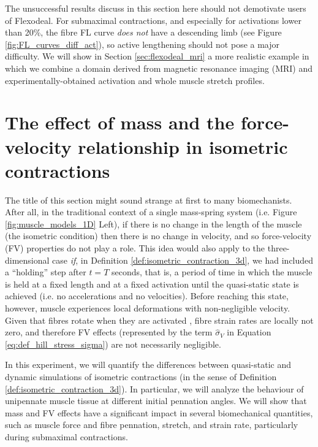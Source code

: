 \documentclass{sfuthesis}
\numberwithin{equation}{section}
\numberwithin{figure}{chapter}
\numberwithin{table}{chapter}
\theoremstyle{definition}
\begin{document}
The unsuccessful results discuss in this section here should not demotivate users of Flexodeal. For submaximal contractions, and especially for activations lower than 20\%, the fibre FL curve \textit{does not} have a descending limb (see Figure \ref{fig:FL_curves_diff_act}), so active lengthening should not pose a major difficulty. We will show in Section \ref{sec:flexodeal_mri} a more realistic example in which we combine a domain derived from magnetic resonance imaging (MRI) and experimentally-obtained activation and whole muscle stretch profiles.

\section{The effect of mass and the force-velocity relationship in isometric contractions} \label{sec:flexodeal_dynamic_effects}

The title of this section might sound strange at first to many biomechanists. After all, in the traditional context of a single mass-spring system (i.e. Figure \ref{fig:muscle_models_1D} Left), if there is no change in the length of the muscle (the isometric condition) then there is no change in velocity, and so force-velocity (FV) properties do not play a role. This idea would also apply to the three-dimensional case \textit{if}, in Definition \ref{def:isometric_contraction_3d}, we had included a ``holding'' step after $t = T$ seconds, that is, a period of time in which the muscle is held at a fixed length and at a fixed activation until the quasi-static state is achieved (i.e. no accelerations and no velocities). Before reaching this state, however, muscle experiences local deformations with non-negligible velocity. Given that fibres rotate when they are activated \cite{LieberFriden2000}, fibre strain rates are locally not zero, and therefore FV effects (represented by the term $\widehat{\sigma}_V$ in Equation \eqref{eq:def_hill_stress_sigma}) are not necessarily negligible.

In this experiment, we will quantify the differences between quasi-static and dynamic simulations of isometric contractions (in the sense of Definition \ref{def:isometric_contraction_3d}). In particular, we will analyze the behaviour of unipennate muscle tissue at different initial pennation angles. We will show that mass and FV effects have a significant impact in several biomechanical quantities, such as muscle force and fibre pennation, stretch, and strain rate, particularly during submaximal contractions.
\end{document}
